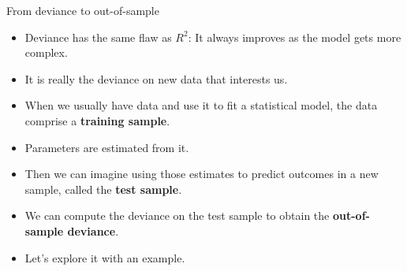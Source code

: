 \documentclass[handout]{beamer}
\begin{document}
\begin{frame}{From deviance to out-of-sample}
\scriptsize{

\begin{itemize}

\item Deviance has the same flaw as $R^2$: It always improves as the model gets more complex.

\item It is really the deviance on new data that interests us.

\item When we usually have data and use it to fit a statistical model, the data comprise a \textbf{training sample}.

\item Parameters are estimated from it.

\item Then we can imagine using those estimates to predict outcomes in a new sample, called the \textbf{test sample}.

\item We can compute the deviance on the test sample to obtain the \textbf{out-of-sample deviance}. 

\item Let's explore it with an example.

\end{itemize}


} 
\end{frame}
\end{document}
